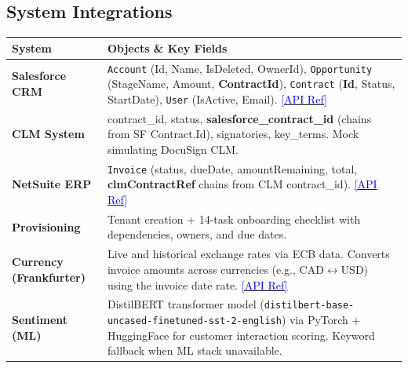 \documentclass[8pt,a4paper]{article}
\begin{document}
\subsection{System Integrations}
\vspace{0.05em}
\begin{table}[H]
\scriptsize
\begin{tabularx}{\textwidth}{@{}lX@{}}
\toprule
\textbf{System} & \textbf{Objects \& Key Fields} \\
\midrule
\textbf{Salesforce CRM} & \texttt{Account} (Id, Name, IsDeleted, OwnerId), \texttt{Opportunity} (StageName, Amount, \textbf{ContractId}), \texttt{Contract} (\textbf{Id}, Status, StartDate), \texttt{User} (IsActive, Email). \href{https://developer.salesforce.com/docs/atlas.en-us.object_reference.meta/object_reference/sforce_api_objects_list.htm}{\textcolor{blue}{[API Ref]}} \\
\textbf{CLM System} & contract\_id, status, \textbf{salesforce\_contract\_id} (chains from SF Contract.Id), signatories, key\_terms. Mock simulating DocuSign CLM. \\
\textbf{NetSuite ERP} & \texttt{Invoice} (status, dueDate, amountRemaining, total, \textbf{clmContractRef} chains from CLM contract\_id). \href{https://system.netsuite.com/help/helpcenter/en_US/APIs/REST_API_Browser/record/v1/2023.1/index.html}{\textcolor{blue}{[API Ref]}} \\
\textbf{Provisioning} & Tenant creation + 14-task onboarding checklist with dependencies, owners, and due dates. \\
\textbf{Currency (Frankfurter)} & Live and historical exchange rates via ECB data. Converts invoice amounts across currencies (e.g., CAD$\leftrightarrow$USD) using the invoice date rate. \href{https://frankfurter.dev}{\textcolor{blue}{[API Ref]}} \\
\textbf{Sentiment (ML)} & DistilBERT transformer model (\texttt{distilbert-base-uncased-finetuned-sst-2-english}) via PyTorch + HuggingFace for customer interaction scoring. Keyword fallback when ML stack unavailable. \\
\bottomrule
\end{tabularx}
\end{table}
\end{document}

